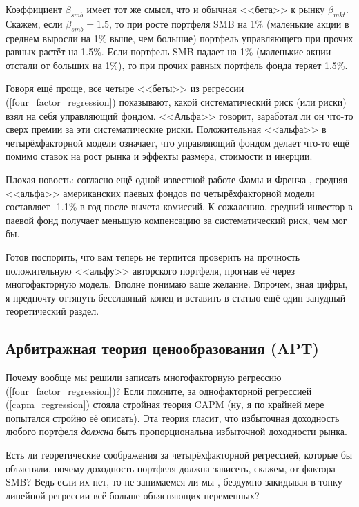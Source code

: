 Коэффициент $\beta_{smb}$ имеет тот же смысл, что и обычная <<бета>> к рынку 
$\beta_{mkt}$. Скажем, если $\beta_{smb}=1.5$, то при росте портфеля SMB на 1\% 
(маленькие акции в среднем выросли на 1\% выше, чем большие) портфель 
управляющего при прочих равных растёт на 1.5\%. Если портфель SMB падает на 1\% 
(маленькие акции отстали от больших на 1\%), то при прочих равных портфель фонда 
теряет 1.5\%.

Говоря ещё проще, все четыре <<беты>> из регрессии 
(\ref{four_factor_regression}) показывают, какой систематический риск (или 
риски) взял на себя управляющий фондом. <<Альфа>> говорит, заработал ли он 
что-то сверх премии за эти систематические риски. Положительная <<альфа>> в 
четырёхфакторной модели означает, что управляющий фондом делает что-то ещё 
помимо ставок на рост рынка и эффекты размера, стоимости и инерции.

Плохая новость: согласно ещё одной известной работе Фамы и Френча 
\cite{fama2010luck}, средняя <<альфа>> американских паевых фондов по 
четырёхфакторной модели составляет -1.1\% в год после вычета комиссий. К 
сожалению, средний инвестор в паевой фонд получает меньшую компенсацию за 
систематический риск, чем мог бы.

Готов поспорить, что вам теперь не терпится проверить на прочность положительную 
<<альфу>> авторского портфеля, прогнав её через многофакторную модель. Вполне 
понимаю ваше желание. Впрочем, зная цифры, я предпочту оттянуть бесславный конец 
и вставить в статью ещё один занудный теоретический раздел.

\subsection{Арбитражная теория ценообразования (APT)}

Почему вообще мы решили записать многофакторную регрессию 
(\ref{four_factor_regression})? Если помните, за однофакторной регрессией 
(\ref{capm_regression}) стояла стройная теория CAPM (ну, я по крайней мере 
попытался стройно её описать). Эта теория гласит, что избыточная доходность 
любого портфеля \emph{должна} быть пропорциональна избыточной доходности рынка.

Есть ли теоретические соображения за четырёхфакторной регрессией, которые бы 
объясняли, почему доходность портфеля должна зависеть, скажем, от фактора SMB? 
Ведь если их нет, то не занимаемся ли мы , 
бездумно закидывая в топку линейной регрессии всё больше объясняющих переменных?


